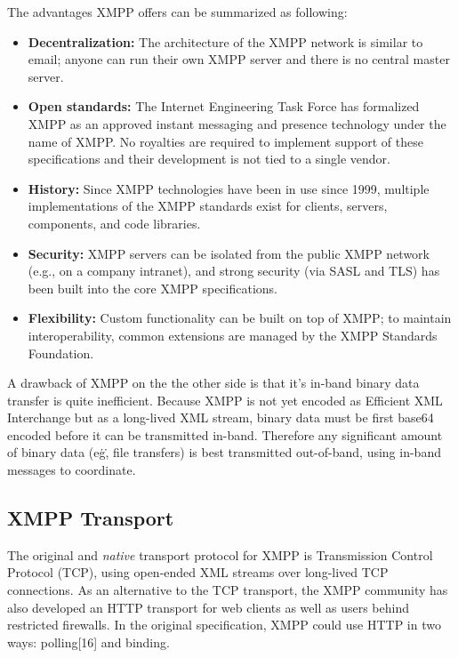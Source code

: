 \documentclass{article}
\begin{document}
\noindent
The advantages XMPP offers can be summarized as following:

\begin{itemize}
    \item \textbf{Decentralization:} The architecture of the XMPP network is similar to email; anyone can run their own XMPP server and there is no central master server.
      \item \textbf{Open standards:} The Internet Engineering Task Force has formalized XMPP as an approved instant messaging and presence technology under the name of XMPP. No royalties are required to implement support of these specifications and their development is not tied to a single vendor.
      \item \textbf{History:} Since XMPP technologies have been in use since 1999, multiple implementations of the XMPP standards exist for clients, servers, components, and code libraries.
      \item \textbf{Security:} XMPP servers can be isolated from the public XMPP network (e.g., on a company intranet), and strong security (via SASL and TLS) has been built into the core XMPP specifications.
      \item \textbf{Flexibility:} Custom functionality can be built on top of XMPP; to maintain interoperability, common extensions are managed by the XMPP Standards Foundation.
\end{itemize}

\noindent
A drawback of XMPP on the the other side is that it's in-band binary data transfer is quite inefficient. Because XMPP is not yet encoded as Efficient XML Interchange but as a long-lived XML stream, binary data must be first base64 encoded before it can be transmitted in-band. Therefore any significant amount of binary data (e\.g\., file transfers) is best transmitted out-of-band, using in-band messages to coordinate.

\subsection{XMPP Transport}

The original and \emph{native} transport protocol for XMPP is Transmission Control Protocol (TCP), using open-ended XML streams over long-lived TCP connections. As an alternative to the TCP transport, the XMPP community has also developed an HTTP transport for web clients as well as users behind restricted firewalls. In the original specification, XMPP could use HTTP in two ways: polling[16] and binding.
\end{document}
